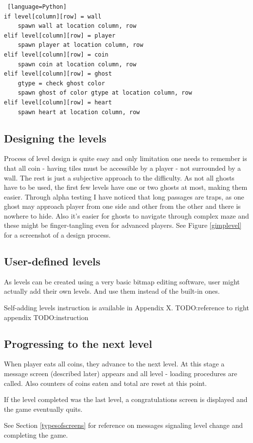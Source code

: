 \documentclass[11pt,a4paper]{report}
\newcommand{\dsubsection}[1]{\FloatBarrier \subsection{#1}}
\begin{document}
				\begin{lstlisting} [language=Python]
if level[column][row] = wall
	spawn wall at location column, row
elif level[column][row] = player
	spawn player at location column, row
elif level[column][row] = coin
	spawn coin at location column, row
elif level[column][row] = ghost
	gtype = check ghost color
	spawn ghost of color gtype at location column, row
elif level[column][row] = heart
	spawn heart at location column, row
				\end{lstlisting}
			\dsubsection{Designing the levels}
				Process of level design is quite easy and only limitation one needs to remember is that all coin - having tiles must be accessible by a player - not surrounded by a wall. The rest is just a subjective approach to the difficulty. As not all ghosts have to be used, the first few levels have one or two ghosts at most, making them easier. Through alpha testing I have noticed that long passages are traps, as one ghost may approach player from one side and other from the other and there is nowhere to hide. Also it's easier for ghosts to navigate through complex maze and these might be finger-tangling even for advanced players.
				See Figure \ref{gimplevel} for a screenshot of a design process.
			\dsubsection{User-defined levels}
				As levels can be created using a very basic bitmap editing software, user might actually add their own levels. And use them instead of the built-in ones.
				
				Self-adding levels instruction is available in Appendix X.
				TODO:reference to right appendix
				TODO:instruction
			\dsubsection{Progressing to the next level}
				When player eats all coins, they advance to the next level. At this stage a message screen (described later) appears and all level - loading procedures are called. Also counters of coins eaten and total are reset at this point.
				
				If the level completed was the last level, a congratulations screen is displayed and the game eventually quits.
				
				See Section \ref{typesofscreens} for reference on messages signaling level change and completing the game.
\end{document}
